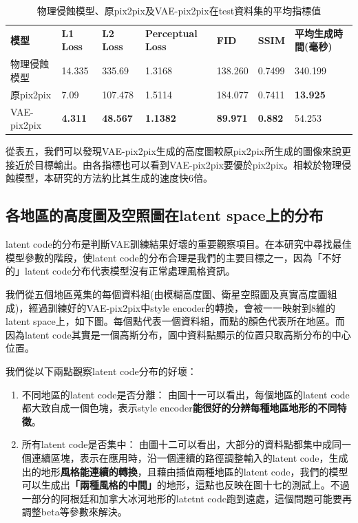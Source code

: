 \documentclass[a4paper, 12pt]{article}
\begin{document}
\begin{table}[htbp]
    \caption{物理侵蝕模型、原pix2pix及VAE-pix2pix在test資料集的平均指標值}
    \label{tab:7}
    \begin{tabularx}{\linewidth}{|Y|Y|Y|Y|Y|Y|Y|}
        \hline
        \textbf{模型} & \textbf{L1 Loss} & \textbf{L2 Loss} & \textbf{Perceptual Loss} & \textbf{FID}    & \textbf{SSIM}  & \textbf{平均生成時間(毫秒)} \\ \hhline{|=|=|=|=|=|=|=|}
        物理侵蝕模型  & 14.335            & 335.69          & 1.3168 & 138.260 & 0.7499         & 340.199                       \\ \hline
        原pix2pix     & 7.09            & 107.478         & 1.5114 & 184.077 & 0.7411         & \textbf{13.925}              \\ \hline
        VAE-pix2pix   & \textbf{4.311}   & \textbf{48.567}   & \textbf{1.1382}           & \textbf{89.971} & \textbf{0.882} & 54.253                     \\ \hline
    \end{tabularx}
\end{table}

從表五，我們可以發現VAE-pix2pix生成的高度圖較原pix2pix所生成的圖像來說更接近於目標輸出。由各指標也可以看到VAE-pix2pix要優於pix2pix。相較於物理侵蝕模型，本研究的方法約比其生成的速度快6倍。

\subsection{各地區的高度圖及空照圖在latent space上的分布}
latent code的分布是判斷VAE訓練結果好壞的重要觀察項目。在本研究中尋找最佳模型參數的階段，使latent code的分布合理是我們的主要目標之一，因為「不好的」latent code分布代表模型沒有正常處理風格資訊。

我們從五個地區蒐集的每個資料組(由模糊高度圖、衛星空照圖及真實高度圖組成)，經過訓練好的VAE-pix2pix中style encoder的轉換，會被一一映射到8維的latent space上，如下圖。每個點代表一個資料組，而點的顏色代表所在地區。而因為latent code其實是一個高斯分布，圖中資料點顯示的位置只取高斯分布的中心位置。

我們從以下兩點觀察latent code分布的好壞：
\begin{enumerate}
\item 不同地區的latent code是否分離：
由圖十一可以看出，每個地區的latent code都大致自成一個色塊，表示style encoder\textbf{能很好的分辨每種地區地形的不同特徵}。

\item 所有latent code是否集中：
由圖十二可以看出，大部分的資料點都集中成同一個連續區塊，表示在應用時，沿一個連續的路徑調整輸入的latent code，生成出的地形\textbf{風格能連續的轉換}，且藉由插值兩種地區的latent code，我們的模型可以生成出\textbf{「兩種風格的中間」}的地形，這點也反映在圖十七的測試上。不過一部分的阿根廷和加拿大冰河地形的latetnt code跑到遠處，這個問題可能要再調整beta等參數來解決。
\end{enumerate}
\end{document}
